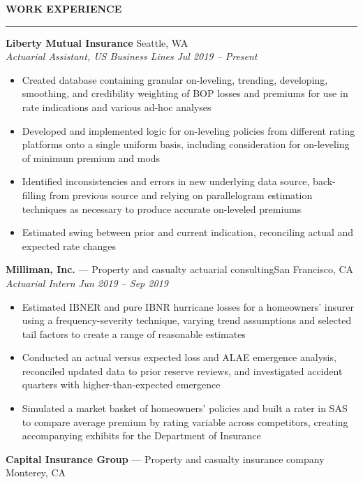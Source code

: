 \documentclass[11pt,letterpaper]{article}
\newcommand{\sectline}{\vspace{5pt}\hrule height 1.5pt\vspace{5pt}}
\newcommand{\smallspace}{\vspace{5pt}}
\begin{document}
\textbf{WORK EXPERIENCE}\sectline
\textbf{Liberty Mutual Insurance}  \hfill Seattle, WA \\
\textit{Actuarial Assistant, US Business Lines} \hfill \textit{Jul 2019 -- Present}
\begin{itemize}
	\item Created database containing granular on-leveling, trending, developing, smoothing, and credibility weighting of BOP losses and premiums for use in rate indications and various ad-hoc analyses
	\item Developed and implemented logic for on-leveling policies from different rating platforms onto a single uniform basis, including consideration for on-leveling of minimum premium and mods
	\item Identified inconsistencies and errors in new underlying data source, back-filling from previous source and relying on parallelogram estimation techniques as necessary to produce accurate on-leveled premiums
	\item Estimated swing between prior and current indication, reconciling actual and expected rate changes
\end{itemize}
\smallspace
\textbf{Milliman, Inc.} --- Property and casualty actuarial consulting\hfill San Francisco, CA \\
\textit{Actuarial Intern} \hfill \textit{Jun 2019 -- Sep 2019}
\begin{itemize}
	\item Estimated IBNER and pure IBNR hurricane losses for a homeowners' insurer using a frequency-severity technique, varying trend assumptions and selected tail factors to create a range of reasonable estimates
	\item Conducted an actual versus expected loss and ALAE emergence analysis, reconciled updated data to prior reserve reviews, and investigated accident quarters with higher-than-expected emergence
	\item Simulated a market basket of homeowners' policies and built a rater in SAS to compare average premium by rating variable across competitors, creating accompanying exhibits for the Department of Insurance
\end{itemize}
\smallspace 
\textbf{Capital Insurance Group} --- Property and casualty insurance company \hfill Monterey, CA \\
\end{document}
